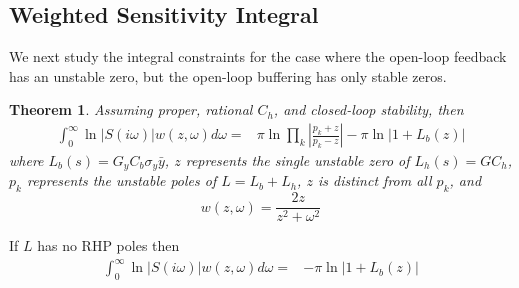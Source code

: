 \documentclass[letterpaper, 10 pt,  conference]{ieeeconf}  %
\newtheorem{theorem}{Theorem}
\begin{document}
\subsection{Weighted Sensitivity Integral}

We next study the integral constraints for the case where the open-loop feedback has an unstable zero, but the open-loop buffering has only stable zeros.
\begin{theorem}\label{th:zero_integral}
Assuming proper, rational $C_h$, and closed-loop stability, then
\begin{equation}\label{eq:zero_integral}
\begin{aligned}
\int_0^\infty \ln|S(i\omega)|w(z,\omega)d\omega =& \pi\ln\prod_k \left|\frac{p_k+z}{p_k-z}\right|-\pi\ln|1+L_b(z)|
\end{aligned}
\end{equation}
where $L_b(s)=G_yC_b \sigma_y\bar{y}$, $z$ represents the single unstable zero of $L_h(s)=GC_h$, $p_k$ represents the unstable poles of $L=L_b+L_h$, $z$ is distinct from all $p_k$, and 
\begin{equation*}
w(z,\omega)= \frac{2z}{z^2+\omega^2}
\end{equation*}
\end{theorem}
If $L$ has no RHP poles then 
\begin{equation*}
\begin{aligned}
\int_0^\infty \ln|S(i\omega)|w(z,\omega)d\omega =& -\pi\ln|1+L_b(z)|
\end{aligned}
\end{equation*}
\end{document}
